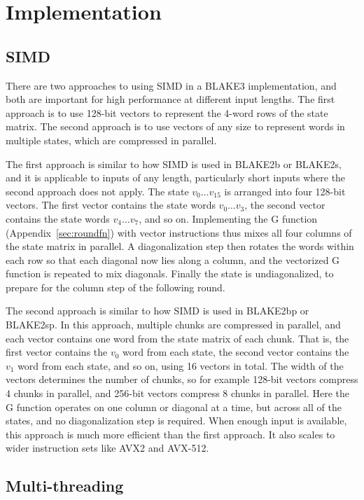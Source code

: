 \documentclass[11pt,notitlepage,a4paper]{article}
\begin{document}
\section{Implementation}\label{sec:implementation}

\subsection{SIMD}\label{sec:simd}

There are two approaches to using SIMD in a BLAKE3 implementation, and both are
important for high performance at different input lengths. The first approach
is to use 128-bit vectors to represent the 4-word rows of the state matrix. The
second approach is to use vectors of any size to represent words in multiple
states, which are compressed in parallel.

The first approach is similar to how SIMD is used in BLAKE2b or BLAKE2s, and it
is applicable to inputs of any length, particularly short inputs where the
second approach does not apply. The state $v_0 \ldots v_{15}$ is arranged into
four 128-bit vectors. The first vector contains the state words $v_0 \ldots
v_3$, the second vector contains the state words $v_4 \ldots v_7$, and so on.
Implementing the G function (Appendix~\ref{sec:roundfn}) with vector
instructions thus mixes all four columns of the state matrix in parallel. A
diagonalization step then rotates the words within each row so that each
diagonal now lies along a column, and the vectorized G function is repeated to
mix diagonals. Finally the state is undiagonalized, to prepare for the column
step of the following round.

The second approach is similar to how SIMD is used in BLAKE2bp or BLAKE2sp. In
this approach, multiple chunks are compressed in parallel, and each vector
contains one word from the state matrix of each chunk. That is, the first
vector contains the $v_0$ word from each state, the second vector contains the
$v_1$ word from each state, and so on, using 16 vectors in total. The width of
the vectors determines the number of chunks, so for example 128-bit vectors
compress 4 chunks in parallel, and 256-bit vectors compress 8 chunks in
parallel. Here the G function operates on one column or diagonal at a time, but
across all of the states, and no diagonalization step is required. When enough
input is available, this approach is much more efficient than the first
approach. It also scales to wider instruction sets like AVX2 and AVX-512.

\subsection{Multi-threading}\label{sec:multithreading}
\end{document}
